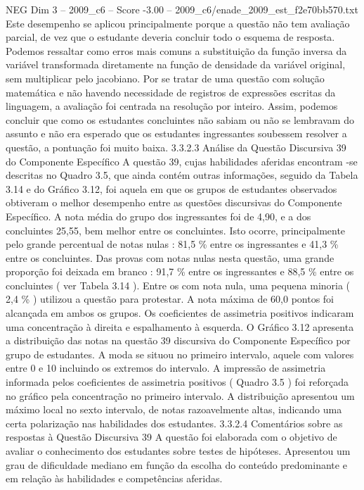 \begin{textsample}{NEG Dim 3 – 2009\_c6 – Score -3.00 – 2009\_c6/enade\_2009\_est\_f2e70bb570.txt}
Este desempenho se aplicou principalmente porque a questão não tem avaliação parcial, de vez que o estudante deveria concluir todo o esquema de resposta.
Podemos ressaltar como erros mais comuns a substituição da função inversa da variável transformada diretamente na função de densidade da variável original, sem multiplicar pelo jacobiano.
Por se tratar de uma questão com solução matemática e não havendo necessidade de registros de expressões escritas da linguagem, a avaliação foi centrada na resolução por inteiro.
Assim, podemos concluir que como os estudantes concluintes não sabiam ou não se lembravam do assunto e não era esperado que os estudantes ingressantes soubessem resolver a questão, a pontuação foi muito baixa. 3.3.2.3 Análise da Questão Discursiva 39 do Componente Específico A questão 39, cujas habilidades aferidas encontram -se descritas no Quadro 3.5, que ainda contém outras informações, seguido da Tabela 3.14 e do Gráfico 3.12, foi aquela em que os grupos de estudantes observados obtiveram o melhor desempenho entre as questões discursivas do Componente Específico.
A nota média do grupo dos ingressantes foi de 4,90, e a dos concluintes 25,55, bem melhor entre os concluintes.
Isto ocorre, principalmente pelo grande percentual de notas nulas : 81,5 \% entre os ingressantes e 41,3 \% entre os concluintes.
Das provas com notas nulas nesta questão, uma grande proporção foi deixada em branco : 91,7 \% entre os ingressantes e 88,5 \% entre os concluintes ( ver Tabela 3.14 ).
Entre os com nota nula, uma pequena minoria ( 2,4 \% ) utilizou a questão para protestar.
A nota máxima de 60,0 pontos foi alcançada em ambos os grupos.
Os coeficientes de assimetria positivos indicaram uma concentração à direita e espalhamento à esquerda.
O Gráfico 3.12 apresenta a distribuição das notas na questão 39 discursiva do Componente Específico por grupo de estudantes.
A moda se situou no primeiro intervalo, aquele com valores entre 0 e 10 incluindo os extremos do intervalo.
A impressão de assimetria informada pelos coeficientes de assimetria positivos ( Quadro 3.5 ) foi reforçada no gráfico pela concentração no primeiro intervalo.
A distribuição apresentou um máximo local no sexto intervalo, de notas razoavelmente altas, indicando uma certa polarização nas habilidades dos estudantes. 3.3.2.4 Comentários sobre as respostas à Questão Discursiva 39 A questão foi elaborada com o objetivo de avaliar o conhecimento dos estudantes sobre testes de hipóteses.
Apresentou um grau de dificuldade mediano em função da escolha do conteúdo predominante e em relação às habilidades e competências aferidas.

\end{textsample}
